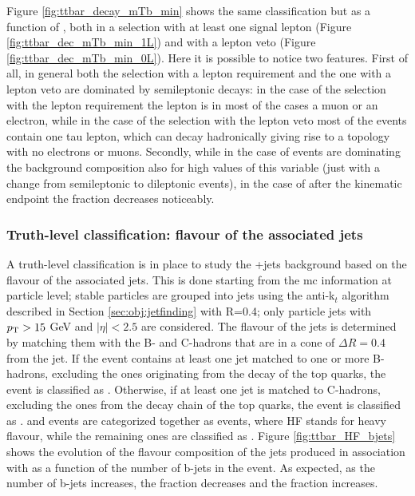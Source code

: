 Figure \ref{fig:ttbar_decay_mTb_min} shows the same \ttbar classification but as a function of \mtb, both in a selection with at least one signal lepton (Figure \ref{fig:ttbar_dec_mTb_min_1L}) and with a lepton veto (Figure \ref{fig:ttbar_dec_mTb_min_0L}). Here it is possible to notice two features. First of all, in general both the selection with a lepton requirement and the one with a lepton veto are dominated by semileptonic decays: in the case of the selection with the lepton requirement the lepton is in most of the cases a muon or an electron, while in the case of the selection with the lepton veto most of the events contain one tau lepton, which can decay hadronically giving rise to a topology with no electrons or muons.
Secondly, while in the case of \mt \ttbar events are dominating the background composition also for high values of this variable (just with a change from semileptonic to dileptonic \ttbar events), in the case of \mtb after the kinematic endpoint the \ttbar fraction decreases noticeably. 




\subsubsection*{Truth-level classification: flavour of the associated jets}

A truth-level classification is in place to study the \ttbar+jets background based on the flavour of the associated jets.
This is done starting from the \gls{mc} information at particle level; stable particles are grouped into jets using the anti-k$_t$ algorithm 
described in Section \ref{sec:obj:jetfinding} with R=0.4; only particle jets with $p_{\rm T} > 15$ GeV and $|\eta|<2.5$ are considered. 
The flavour of the jets is determined by matching them with the B- and C-hadrons that are in a cone of $\Delta R = 0.4$ from the jet. 
If the event contains at least one jet matched to one or more B-hadrons, excluding the ones originating from the decay of the top quarks, the event 
is classified as \ttbb. Otherwise, if at least one jet is matched to C-hadrons, excluding the ones from the decay chain of the top quarks, the event is classified as \ttcc. \ttbb and \ttcc events are categorized together as \tthf events, where HF stands for heavy flavour, while the remaining ones are classified as \ttlight.
Figure \ref{fig:ttbar_HF_bjets} shows the evolution of the flavour composition of the jets produced in association with \ttbar
as a function of the number of b-jets in the event. 
As expected, as the number of b-jets increases, the \ttlight fraction decreases and the \ttbb fraction increases. 

